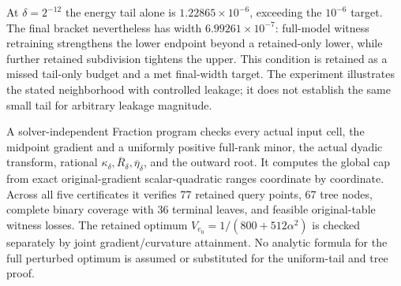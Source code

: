 At $\delta=2^{-12}$ the energy tail alone is $1.22865\times10^{-6}$, exceeding the $10^{-6}$ target. The final bracket nevertheless has width $6.99261\times10^{-7}$: full-model witness retraining strengthens the lower endpoint beyond a retained-only lower, while further retained subdivision tightens the upper. This condition is retained as a missed tail-only budget and a met final-width target. The experiment illustrates the stated neighborhood with controlled leakage; it does not establish the same small tail for arbitrary leakage magnitude.

A solver-independent Fraction program checks every actual input cell, the midpoint gradient and a uniformly positive full-rank minor, the actual dyadic transform, rational $\kappa_\delta,\overline R_\delta,\overline\eta_\delta$, and the outward root. It computes the global cap from exact original-gradient scalar-quadratic ranges coordinate by coordinate. Across all five certificates it verifies 77 retained query points, 67 tree nodes, complete binary coverage with 36 terminal leaves, and feasible original-table witness losses. The retained optimum $V_{e_0}=1/(800+512\alpha^2)$ is checked separately by joint gradient/curvature attainment. No analytic formula for the full perturbed optimum is assumed or substituted for the uniform-tail and tree proof.
